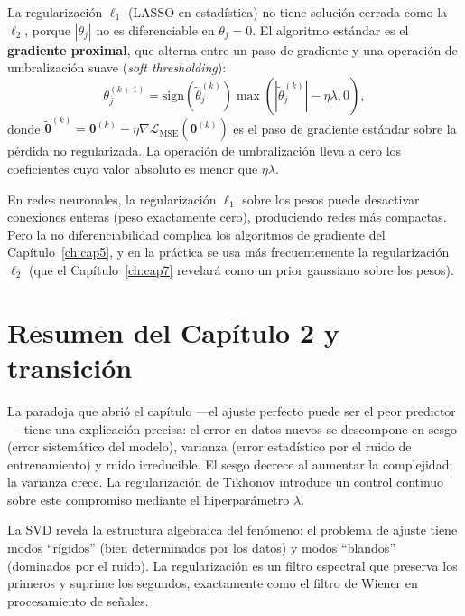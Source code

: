 La regularización $\ell_1$ (LASSO en estadística) no tiene solución
cerrada como la $\ell_2$, porque $|\theta_j|$ no es diferenciable
en $\theta_j = 0$. El algoritmo estándar es el \textbf{gradiente
proximal}, que alterna entre un paso de gradiente y una operación de
umbralización suave (\textit{soft thresholding}):
\begin{equation}
  \theta_j^{(k+1)}
  = \text{sign}(\tilde{\theta}_j^{(k)})
  \max(|\tilde{\theta}_j^{(k)}| - \eta\lambda, 0),
  \label{eq:soft_thresh}
\end{equation}
donde $\tilde{\bm{\theta}}^{(k)} = \bm{\theta}^{(k)} - \eta
\nabla\mathcal{L}_{\text{MSE}}(\bm{\theta}^{(k)})$ es el paso de
gradiente estándar sobre la pérdida no regularizada. La operación de
umbralización lleva a cero los coeficientes cuyo valor absoluto es
menor que $\eta\lambda$.

En redes neuronales, la regularización $\ell_1$ sobre los pesos puede
desactivar conexiones enteras (peso exactamente cero), produciendo
redes más compactas. Pero la no diferenciabilidad complica los
algoritmos de gradiente del Capítulo~\ref{ch:cap5}, y en la práctica se
usa más frecuentemente la regularización $\ell_2$ (que el
Capítulo~\ref{ch:cap7} revelará como un prior gaussiano sobre los
pesos).

\section{Resumen del Capítulo 2 y transición}
\label{sec:resumen2}

La paradoja que abrió el capítulo —el ajuste perfecto puede ser el peor
predictor— tiene una explicación precisa: el error en datos nuevos se
descompone en sesgo (error sistemático del modelo), varianza (error
estadístico por el ruido de entrenamiento) y ruido irreducible. El
sesgo decrece al aumentar la complejidad; la varianza crece. La
regularización de Tikhonov introduce un control continuo sobre este
compromiso mediante el hiperparámetro $\lambda$.

La SVD revela la estructura algebraica del fenómeno: el problema de
ajuste tiene modos ``rígidos'' (bien determinados por los datos) y
modos ``blandos'' (dominados por el ruido). La regularización es un
filtro espectral que preserva los primeros y suprime los segundos,
exactamente como el filtro de Wiener en procesamiento de señales.

